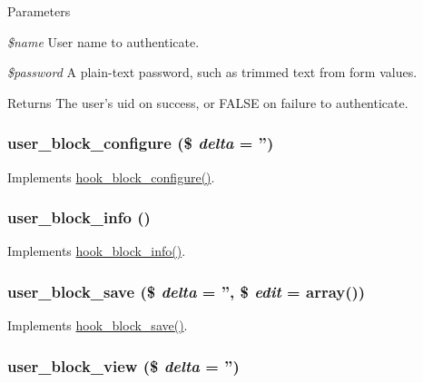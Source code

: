 \begin{DoxyParams}{Parameters}
\item[{\em \$name}]User name to authenticate. \item[{\em \$password}]A plain-\/text password, such as trimmed text from form values. \end{DoxyParams}
\begin{DoxyReturn}{Returns}
The user's uid on success, or FALSE on failure to authenticate. 
\end{DoxyReturn}
\hypertarget{user_8module_a5494cdcda6f0d2930656ed704d9fbfa8}{
\subsubsection[{user\_\-block\_\-configure}]{\setlength{\rightskip}{0pt plus 5cm}user\_\-block\_\-configure (\$ {\em delta} = {\ttfamily ''})}}
\label{user_8module_a5494cdcda6f0d2930656ed704d9fbfa8}
Implements \hyperlink{group__hooks_gacc86fefd1e0299f387f79a37dd1a48b7}{hook\_\-block\_\-configure()}. \hypertarget{user_8module_ace25ccf18bbb198c6f2f3f60735f1b3d}{
\subsubsection[{user\_\-block\_\-info}]{\setlength{\rightskip}{0pt plus 5cm}user\_\-block\_\-info ()}}
\label{user_8module_ace25ccf18bbb198c6f2f3f60735f1b3d}
Implements \hyperlink{group__hooks_ga2bd926c3e90deeba0c3ba64fb3c64d73}{hook\_\-block\_\-info()}. \hypertarget{user_8module_adeeb8b22b27c97b3e3aff38487c03f4c}{
\subsubsection[{user\_\-block\_\-save}]{\setlength{\rightskip}{0pt plus 5cm}user\_\-block\_\-save (\$ {\em delta} = {\ttfamily ''}, \/  \$ {\em edit} = {\ttfamily array()})}}
\label{user_8module_adeeb8b22b27c97b3e3aff38487c03f4c}
Implements \hyperlink{group__hooks_ga622024ce4f818c241ca7a765e829f928}{hook\_\-block\_\-save()}. \hypertarget{user_8module_ac06f7fc22561ebb4ad7130564bb7526e}{
\subsubsection[{user\_\-block\_\-view}]{\setlength{\rightskip}{0pt plus 5cm}user\_\-block\_\-view (\$ {\em delta} = {\ttfamily ''})}}
